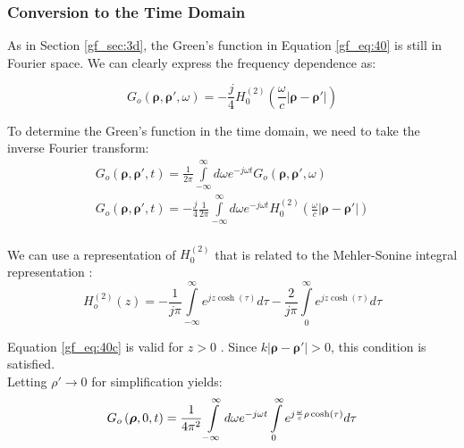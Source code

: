 \subsubsection{Conversion to the Time Domain}
As in Section \ref{gf_sec:3d}, the Green's function in Equation \ref{gf_eq:40} is still in Fourier space. We can clearly express the frequency dependence as:

\begin{equation}
G_o\left(\boldsymbol{\rho},\boldsymbol{\rho}',\omega\right) = -\frac{j}{4}H_0^{(2)}\left(\frac{\omega}{c}|\boldsymbol{\rho} - \boldsymbol{\rho}' | \right)
\label{gf_eq:40a}
\end{equation}
\renewcommand{\baselinestretch}{2} \small\normalsize

To determine the Green's function in the time domain, we need to take the inverse Fourier transform:
\begin{equation}
\begin{gathered}
G_o\left(\boldsymbol{\rho},\boldsymbol{\rho}',t\right) = \frac{1}{2\pi}\int\limits_{-\infty}^{\infty}d\omega e^{-j\omega t}G_o\left(\boldsymbol{\rho},\boldsymbol{\rho}',\omega\right) \\
G_o\left(\boldsymbol{\rho},\boldsymbol{\rho}',t\right) = -\frac{j}{4}\frac{1}{2\pi}\int\limits_{-\infty}^{\infty}d\omega e^{-j\omega t} H_0^{(2)}\left(\frac{\omega}{c}|\boldsymbol{\rho} - \boldsymbol{\rho}' | \right)\\
\end{gathered}
\label{gf_eq:40b}
\end{equation}
\renewcommand{\baselinestretch}{2} \small\normalsize

We can use a representation of $H_0^{(2)}$ that is related to the Mehler-Sonine integral representation \cite{nist_handbook}:
\begin{equation}
H_o^{(2)}\left(z\right) = -\frac{1}{j\pi}\int\limits_{-\infty}^{\infty}e^{jz\cosh(\tau)}d\tau -\frac{2}{j\pi}\int\limits_{0}^{\infty}e^{jz\cosh(\tau)}d\tau
\label{gf_eq:40c}
\end{equation}
\renewcommand{\baselinestretch}{2} \small\normalsize

\noindent Equation \ref{gf_eq:40c} is valid for $z>0$ . Since $k| \boldsymbol{\rho} - \boldsymbol{\rho}'| > 0$, this condition is satisfied. \\

\noindent Letting $\rho' \rightarrow 0$ for simplification yields:
\begin{equation}
G_o\left(\boldsymbol{\rho},0,t\right) = \frac{1}{4\pi^2}\int\limits_{-\infty}^{\infty}d\omega e^{-j\omega t} \int\limits_{0}^{\infty}e^{j\frac{\omega}{c}\rho\cosh(\tau)}d\tau\\
\label{gf_eq:40d}
\end{equation}
\renewcommand{\baselinestretch}{2} \small\normalsize

